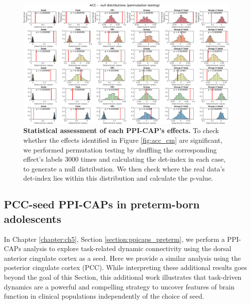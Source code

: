 \begin{figure}[h]
\centering
\includegraphics[width=1\textwidth]{images/Appendix/ACCK6_stats_permutation2.png}
\vspace{5mm}
\caption{\textbf{Statistical assessment of each PPI-CAP's effects.} To check whether the effects identified in Figure \ref{fig:acc_cm} are significant, we performed permutation testing by shuffling the corresponding effect's labels 3000 times and calculating the det-index in each case, to generate a null distribution. We then check where the real data's det-index lies within this distribution and calculate the p-value. }
\label{fig:app_acc_stats}
\end{figure}








\clearpage
\subsection{PCC-seed PPI-CAPs in preterm-born adolescents} \label{sm_pcc_ppicaps}
 In Chapter \ref{chapter:ch5}, Section \ref{section:ppicaps_preterm}, we perform a PPI-CAPs analysis to explore task-related dynamic connectivity using the dorsal anterior cingulate cortex as a seed. Here we provide a similar analysis using the posterior cingulate cortex (PCC). While interpreting these additional results goes beyond the goal of this Section, this additional work illustrates that task-driven dynamics are a powerful and compelling strategy to uncover features of brain function in clinical populations independently of the choice of seed. 
\vspace{1cm}




